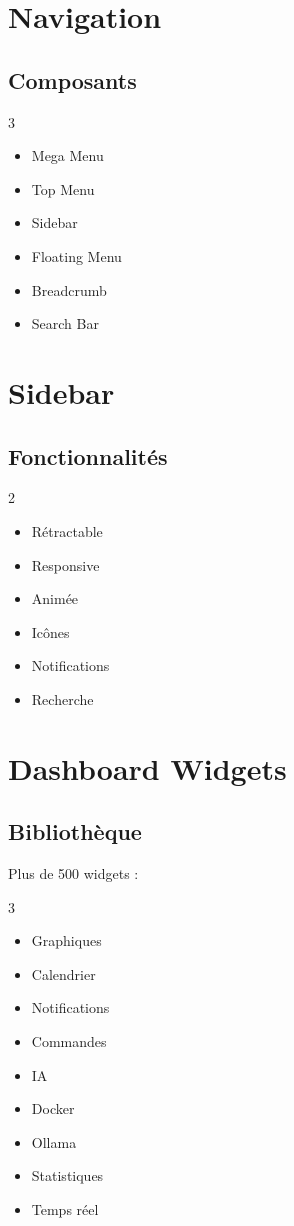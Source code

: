 \documentclass[12pt,a4paper,oneside]{book}
\begin{document}
\chapter{Navigation}

\section{Composants}
\begin{multicols}{3}
\begin{itemize}
\item Mega Menu
\item Top Menu
\item Sidebar
\item Floating Menu
\item Breadcrumb
\item Search Bar
\end{itemize}
\end{multicols}

\chapter{Sidebar}

\section{Fonctionnalités}
\begin{multicols}{2}
\begin{itemize}
\item Rétractable
\item Responsive
\item Animée
\item Icônes
\item Notifications
\item Recherche
\end{itemize}
\end{multicols}

\chapter{Dashboard Widgets}

\section{Bibliothèque}
Plus de 500 widgets :
\begin{multicols}{3}
\begin{itemize}
\item Graphiques
\item Calendrier
\item Notifications
\item Commandes
\item IA
\item Docker
\item Ollama
\item Statistiques
\item Temps réel
\end{itemize}
\end{multicols}
\end{document}
